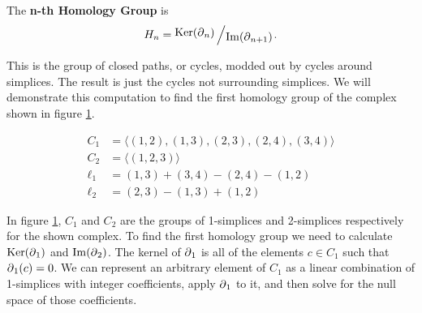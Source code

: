
\begin{definition}\label{def:nth-homology-group}
    The \textbf{n-th Homology Group} is \[H_n = \bigslant{\Ker(\boundary_n)}{\Ima(\boundary_{n+1})}.\]
    \cite{fraleigha}
\end{definition}

This is the group of closed paths, or cycles, modded out by cycles around simplices. The result is just the cycles not surrounding simplices. We will demonstrate this computation to find the first homology group of the complex shown in figure \ref{fig:example-cech}.

\begin{example}

    \begin{figure}
        \centering
        \begin{minipage}{.5\textwidth}
            \centering
            
        \end{minipage}%
        \begin{minipage}{.5\textwidth}
            \begin{align*}
                C_1 &= \langle (1,2),(1,3),(2,3),(2,4),(3,4) \rangle \\
                C_2 &= \langle (1,2,3) \rangle \\
                \ell_1 &= (1,3) + (3,4) - (2,4) - (1,2)\\
                \ell_2 &= (2,3) - (1,3) + (1,2)
            \end{align*}
        \end{minipage}
        \caption{}
        \label{fig:example-cech}
    \end{figure}

    In figure \ref{fig:example-cech}, \(C_1\) and \(C_2\) are the groups of 1-simplices and 2-simplices respectively for the shown complex.
    To find the first homology group we need to calculate \(\operatorname{Ker}(\operatorname{\partial}_1)\) and \(\operatorname{Im}(\operatorname{\partial}_2)\).
    The kernel of \(\operatorname{\partial}_1\) is all of the elements \(c \in C_1\) such that \(\operatorname{\partial}_1(c) = 0\). We can represent an arbitrary element of \(C_1\) as a linear combination of 1-simplices with integer coefficients, apply \(\operatorname{\partial}_1\) to it, and then solve for the null space of those coefficients.


\end{example}
